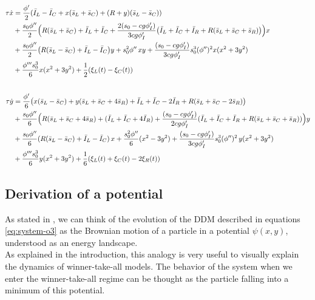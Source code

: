 \documentclass[12,twoside]{TFG-GM}
\theoremstyle{definition}
\theoremstyle{remark}
\begin{document}
\begin{subequations}\label{eq:system-o3} %

\begin{align}
\tau \dot{x} &=\frac{\phi'}{2}(\bar{I}_L -  \bar{I}_C + x(\bar{s}_L+ \bar{s}_C)+(R+y) (\bar{s}_L - \bar{s}_C))  \notag\\
&+ \frac{s_0\phi''}{2}\Bigl(R(\bar{s}_L+\bar{s}_C) +\bar{I}_L + \bar{I}_C + \frac{2(s_0-cg\phi'_I)}{3cg\phi'_I}\bigl(\bar{I}_L+\bar{I}_C+\bar{I}_R + R(\bar{s}_L+ \bar{s}_C+ \bar{s}_R)\bigr)\Bigr)x \notag\\
&+ \frac{s_0\phi''}{2}\bigl(R(\bar{s}_L-\bar{s}_C) + \bar{I}_L - \bar{I}_C\bigr)y 
  + s_0^2\phi''\,xy 
  + \frac{(s_0-cg\phi'_I)}{3cg\phi'_I} s_0^3(\phi'')^2 x(x^2+3y^2) \label{eq:system-o3-x}\\
&+ \frac{\phi'''s_0^3}{6}  x(x^2+3y^2) 
  + \frac12(\xi_L(t)-\xi_C(t))\notag\\[2em]
\tau \dot{y} &= \frac{\phi'}{6}\bigl(x(\bar{s}_L- \bar{s}_C)+y(\bar{s}_L +\bar{s}_C+4\bar{s}_R)
  +\bar{I}_L +  \bar{I}_C - 2 \bar{I}_R +  R(\bar{s}_L+ \bar{s}_C -2\bar{s}_R)\bigr) \notag\\
&+ \frac{s_0\phi''}{6}\Bigl(R(\bar{s}_L+\bar{s}_C+4\bar{s}_R) + (\bar{I}_L + \bar{I}_C + 4\bar{I}_R) 
  + \frac{(s_0-cg\phi'_I)}{2cg\phi'_I}(\bar{I}_L+\bar{I}_C+\bar{I}_R + R(\bar{s}_L+ \bar{s}_C+\bar{s}_R))\Bigr)y \notag\\
&+ \frac{s_0\phi''}{6}(R(\bar{s}_L-\bar{s}_C) + \bar{I}_L - \bar{I}_C)\,x
  + \frac{s_0^2\phi''}{6}(x^2-3y^2) + \frac{(s_0-cg\phi'_I)}{3cg\phi'_I}s_0^3(\phi'')^2\,y(x^2+3y^2) \label{eq:system-o3-y}\\
& + \frac{\phi'''s_0^3}{6}y(x^2+3y^2)
  + \frac16(\xi_L(t)+\xi_C(t)-2\xi_R(t))\notag
\end{align}

\end{subequations}


\subsection{Derivation of a potential}\label{sec:derivation-potential}
As stated in \cite{roxin2008}, we can think of the evolution of the DDM described in equations \ref{eq:system-o3} as the Brownian motion of a particle in a potential $\psi(x,y)$, understood as an energy landscape.\\ 
As explained in the introduction, this analogy is very useful to visually explain the dynamics of winner-take-all models. The behavior of the system when we enter the winner-take-all regime can be thought as the particle falling into a minimum of this potential.
\end{document}
